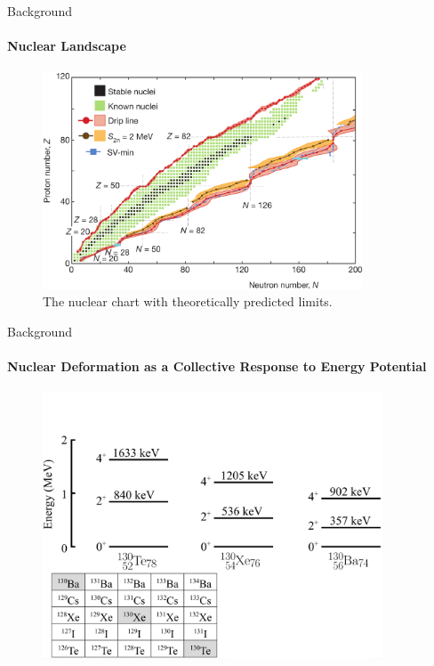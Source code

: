 \documentclass{beamer}
\begin{document}
\begin{frame}{Background}
\framesubtitle{Nuclear Landscape}
\begin{figure}[!hht]
  \centering
  \includegraphics[width=0.85\textwidth, keepaspectratio]{NuclearLimit.png}
  \caption{The nuclear chart with theoretically predicted limits\footnotemark[1].}
  \label{ShellFermi}
\end{figure}
\end{frame}



\begin{frame}{Background}
\framesubtitle{Nuclear Deformation as a Collective Response to Energy Potential}
\begin{figure}[!hht]
  \centering
  \includegraphics[width=0.9\textwidth, keepaspectratio]{CastenLevels_1.png}
\end{figure}
\end{frame}
\end{document}
